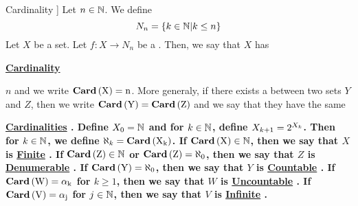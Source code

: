 \label{def:Cardinality}
\newcommand{\Cardinal}[0]{
    \bf \hyperref[def:Cardinality]{Cardinal} \rm
}
\newcommand{\Cardinals}[0]{
    \bf \hyperref[def:Cardinality]{Cardinals} \rm
}
\newcommand{\Cardinality}[0]{
    \bf \hyperref[def:Cardinality]{Cardinality} \rm
}
\newcommand{\Cardinalities}[0]{
    \bf \hyperref[def:Cardinality]{Cardinalities} \rm
}
\newcommand{\FirstNaturals}[1]{
    N_{#1}
}
\newcommand{\CardinalityFunction}[1]{
    \bf
    Card
    \rm
    \pa{#1}
}
\newcommand{\Finite}[0]{
    \bf \hyperref[def:Cardinality]{Finite} \rm
}
\newcommand{\Infinite}[0]{
    \bf \hyperref[def:Cardinality]{Infinite} \rm
}
\newcommand{\Denumerable}[0]{
    \bf \hyperref[def:Cardinality]{Denumerable} \rm
}
\newcommand{\Countable}[0]{
    \bf \hyperref[def:Cardinality]{Countable} \rm
}
\newcommand{\Uncountable}[0]{
    \bf \hyperref[def:Cardinality]{Uncountable} \rm
}
\begin{df}[\Cardinality]
    Let $n \in \mathbb{N}$. We define 
    \begin{equation*}
        \FirstNaturals{n}=\{ k \in \N | k \leq n\}
    \end{equation*}
    Let $X$ be a set.
    Let $f:X \to \FirstNaturals{n}$ 
    be a 
    \Bijection. 
    Then, we say that 
    $X$ has 
    \Cardinality
    $n$
    and we write 
    $\CardinalityFunction{X}=n$.
    More generaly, if there exists a 
    \Bijection
    between two sets 
    $Y$ and $Z$, then we write
    $\CardinalityFunction{Y}=\CardinalityFunction{Z}$
    and we say that they have the same 
    \Cardinalities. 
    Define
    $X_0=\mathbb{N}$
    and for $k \in \mathbb{N}$, define 
    $X_{k+1} = 2^{X_k}$. 
    Then for $k \in \mathbb{N}$, we define 
    $\aleph_k = \CardinalityFunction{X_k}$.
    If $\CardinalityFunction{X} \in \N$, then 
    we say that $X$ is \Finite. 
    If $\CardinalityFunction{Z} \in \N$ or 
    $\CardinalityFunction{Z} = \aleph_0$, 
    then we say that $Z$ is \Denumerable.
    If $\CardinalityFunction{Y} = \aleph_0$, then
    we say that $Y$ is \Countable.
    If $\CardinalityFunction{W}= \alpha_k$ for $k \geq 1$, 
    then we say that $W$ is \Uncountable. 
    If $\CardinalityFunction{V} = \alpha_j$ for $j \in \mathbb{N}$, 
    then we say that $V$ is \Infinite. 


\end{df}



